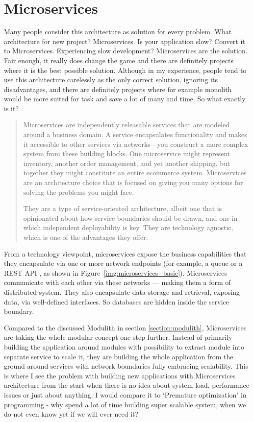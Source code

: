 \section{Microservices}
\label{section:microservices}
Many people consider this architecture as solution for every problem. What architecture for new project? Microservices. Is your application slow? Convert it to Microservices. Experiencing slow development? Microservices are the solution. Fair enough, it really does change the game and there are definitely projects where it is the best possible solution. Although in my experience, people tend to use this architecture carelessly as the only correct solution, ignoring its disadvantages, and there are definitely projects where for example monolith would be more suited for task and save a lot of many and time. So what exactly is it?

\begin{quote}
    Microservices are independently releasable services that are modeled around a business domain. A service encapsulates functionality and makes it accessible to other services via networks—you construct a more complex system from these building blocks. One microservice might represent inventory, another order management, and yet another shipping, but together they might constitute an entire ecommerce system. Microservices are an architecture choice that is focused on giving you many options for solving the problems you might face. \cite{BUILDING_MS_WHAT_ARE}

    They are a type of service-oriented architecture, albeit one that is opinionated about how service boundaries should be drawn, and one in which independent deployability is key. They are technology agnostic, which is one of the advantages they offer. \cite{BUILDING_MS_WHAT_ARE}
\end{quote}


From a technology viewpoint, microservices expose the business capabilities that they encapsulate via one or more network endpoints \cite{MON_TO_MS_MICROSERVICE} (for example, a queue or a REST API \cite{BUILDING_MS_WHAT_ARE}, as shown in Figure~\ref{img:microservices_basic}). Microservices communicate with each other via these networks — making them a form of distributed system. They also encapsulate data storage and retrieval, exposing data, via well-defined interfaces. So databases are hidden inside the service boundary. \cite{MON_TO_MS_MICROSERVICE}

Compared to the discussed Modulith in section \ref{section:modulith}, Microservices are taking the whole modular concept one step further. Instead of primarily building the application around modules with possibility to extract module into separate service to scale it, they are building the whole application from the ground around services with network boundaries fully embracing scalability. This is where I see the problem with building new applications with Microservices architecture from the start when there is no idea about system load, performance issues or just about anything. I would compare it to `Premature optimization' in programming - why spend a lot of time building super scalable system, when we do not even know yet if we will ever need it?


